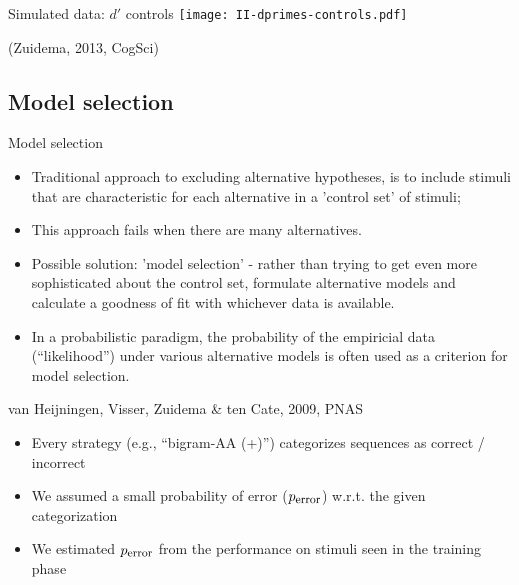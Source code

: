 \documentclass[xcolor=table]{beamer}
\newcommand{\sub}[1]{\mbox{\footnotesize #1}}
\begin{document}
\begin{frame}{Simulated data: $d'$ controls}
\texttt{[image: II-dprimes-controls.pdf]}

\small (Zuidema, 2013, CogSci)
\end{frame}

\subsection{Model selection}

\begin{frame}{Model selection}
  \begin{itemize}[<+->]
  \item Traditional approach to excluding alternative hypotheses, is
    to include stimuli that are characteristic for each alternative in
    a 'control set' of stimuli;
  \item This approach fails when there are many alternatives.
  \item Possible solution: 'model selection' - rather than trying to
    get even more sophisticated about the control set, formulate
    alternative models and calculate a goodness of
    fit %
    with whichever data is available.
  \item In a probabilistic paradigm, the probability of the empiricial
    data (``likelihood'') under various alternative models is often
    used as a criterion for model selection.
  \end{itemize}

\end{frame}

\begin{frame}{van Heijningen, Visser, Zuidema \& ten Cate, 2009, PNAS}
  \begin{itemize}
  \item Every strategy (e.g., ``bigram-AA (+)'') categorizes sequences as correct / incorrect
  \item We assumed a small probability of error ($p_{\sub{error}}$) w.r.t. the given categorization
  \item We estimated $p_{\sub{error}}$ from the performance on stimuli seen in the training phase
  \end{itemize}
\end{frame}
\end{document}
